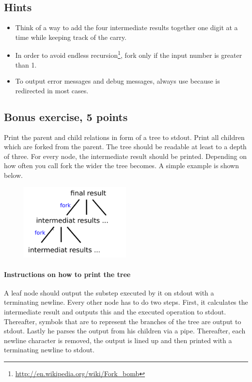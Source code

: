 \clearpage
\subsection*{Hints}

\begin{itemize}
\item Think of a way to add the four intermediate results together
one digit at a time while keeping track of the carry.
\item In order to avoid endless recursion\footnote{\url{http://en.wikipedia.org/wiki/Fork\_bomb}},
fork only if the input number is greater than 1.
\item To output error messages and debug messages, always use
 because  is redirected in most cases.
\end{itemize}

\subsection*{Bonus exercise, 5 points}
Print the parent and child relations in form of a tree to stdout. Print all children which are forked from the parent.
The tree should be readable at least to a depth of three.
For every node, the intermediate result should be printed.\newline
Depending on how often you call fork the wider the tree becomes. A simple example is shown below.

\begin{figure}[h!]
	\centering
	\includegraphics[width=0.5\textwidth]{./../BonusExercise.png}
\end{figure}

\paragraph{Instructions on how to print the tree}
A leaf node should output the substep executed by it on stdout with a terminating newline. Every other node has to do two steps. First, it calculates the intermediate result and outputs this and the executed operation to stdout. Thereafter, symbols that are to represent the branches of the tree are output to stdout. Lastly he parses the output from his children via a pipe. Thereafter, each newline character is removed, the output is lined up and then printed with a terminating newline to stdout.
